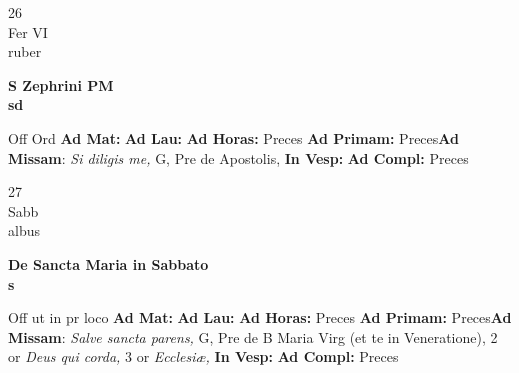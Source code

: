 \documentclass[10pt, openany]{book}
\begin{document}
    \begin{center}
        \begin{minipage}{3.5in}
            \vspace{2em}
            \begin{minipage}{0.5in}
                {\Huge 26} \\
                {\normalsize Fer VI} \\
                {\normalsize ruber}
            \end{minipage}
            \begin{minipage}{3.0in}
                \textbf{ \large S Zephrini PM \\
                \textnormal{\normalsize sd}} \\ 
            \end{minipage}
            \begin{justify}Off Ord
                \textbf{Ad Mat: }
                \textbf{Ad Lau: }
                \textbf{Ad Horas: }Preces
                \textbf{Ad Primam: }Preces\textbf{Ad Missam}: \textit{Si diligis me,} G, Pre de Apostolis,  
                \textbf{In Vesp: }
                \textbf{Ad Compl: }Preces
            \end{justify}
        \end{minipage}
    \end{center}

    \begin{center}
        \begin{minipage}{3.5in}
            \vspace{2em}
            \begin{minipage}{0.5in}
                {\Huge 27} \\
                {\normalsize Sabb} \\
                {\normalsize albus}
            \end{minipage}
            \begin{minipage}{3.0in}
                \textbf{ \large De Sancta Maria in Sabbato \\
                \textnormal{\normalsize s}} \\ 
            \end{minipage}
            \begin{justify}Off ut in pr loco
                \textbf{Ad Mat: }
                \textbf{Ad Lau: }
                \textbf{Ad Horas: }Preces
                \textbf{Ad Primam: }Preces\textbf{Ad Missam}: \textit{Salve sancta parens,} G, Pre de B Maria Virg (et te in Veneratione), 2 or \textit{Deus qui corda,} 3 or \textit{Ecclesiæ,}  
                \textbf{In Vesp: }
                \textbf{Ad Compl: }Preces
            \end{justify}
        \end{minipage}
    \end{center}
\end{document}
